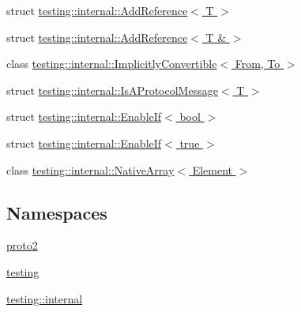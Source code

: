 \begin{DoxyCompactItemize}
\item 
struct \hyperlink{structtesting_1_1internal_1_1_add_reference}{testing\-::internal\-::\-Add\-Reference$<$ T $>$}
\item 
struct \hyperlink{structtesting_1_1internal_1_1_add_reference_3_01_t_01_6_01_4}{testing\-::internal\-::\-Add\-Reference$<$ T \& $>$}
\item 
class \hyperlink{classtesting_1_1internal_1_1_implicitly_convertible}{testing\-::internal\-::\-Implicitly\-Convertible$<$ From, To $>$}
\item 
struct \hyperlink{structtesting_1_1internal_1_1_is_a_protocol_message}{testing\-::internal\-::\-Is\-A\-Protocol\-Message$<$ T $>$}
\item 
struct \hyperlink{structtesting_1_1internal_1_1_enable_if}{testing\-::internal\-::\-Enable\-If$<$ bool $>$}
\item 
struct \hyperlink{structtesting_1_1internal_1_1_enable_if_3_01true_01_4}{testing\-::internal\-::\-Enable\-If$<$ true $>$}
\item 
class \hyperlink{classtesting_1_1internal_1_1_native_array}{testing\-::internal\-::\-Native\-Array$<$ Element $>$}
\end{DoxyCompactItemize}
\subsection*{Namespaces}
\begin{DoxyCompactItemize}
\item 
\hyperlink{namespaceproto2}{proto2}
\item 
\hyperlink{namespacetesting}{testing}
\item 
\hyperlink{namespacetesting_1_1internal}{testing\-::internal}
\end{DoxyCompactItemize}

